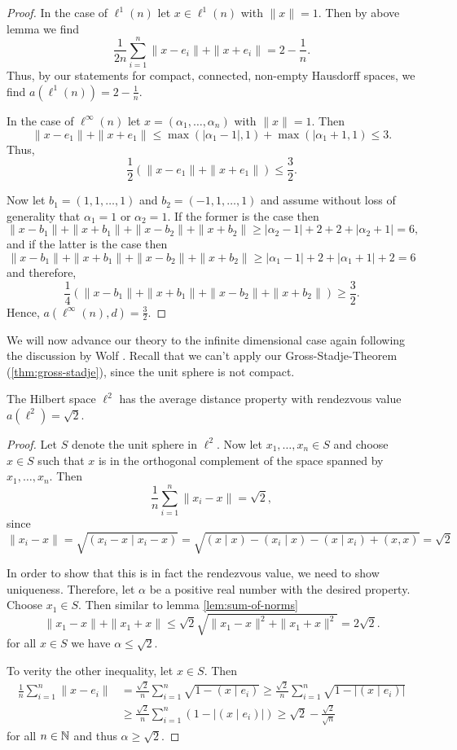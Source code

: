\begin{proof}
	In the case of $\ell^1(n)$ let $x\in \ell^1(n)$ with $\|x\|=1$. Then by above lemma we find\[
	\frac{1}{2n}\sum_{i=1}^{n}\|x-e_i\|+\|x+e_i\|=2-\frac{1}{n}.
	\]
	Thus, by our statements for compact, connected, non-empty Hausdorff spaces, we find $a(\ell^1(n))=2-\frac{1}{n}$.
	
	In the case of $\ell^\infty(n)$ let $x=(\alpha_1,\dots,\alpha_n)$ with $\|x\|=1$. Then
	\[
	\|x-e_1\|+\|x+e_1\|\leq \max(|\alpha_1-1|,1)+\max(|\alpha_1+1,1)\leq 3.
	\]
	Thus, 
	\[
	\frac{1}{2}(\|x-e_1\|+\|x+e_1\|)\leq \frac{3}{2}.
	\]
	
	Now let $b_1=(1,1,\dots,1)$ and $b_2=(-1,1,\dots,1)$ and assume without loss of generality that $\alpha_1=1$ or $\alpha_2=1$.
	If the former is the case then
	\[
	\|x-b_1\|+\|x+b_1\|+\|x-b_2\|+\|x+b_2\|\geq |\alpha_2-1|+2+2+|\alpha_2+1|=6,
	\]
	and if the latter is the case then
	\[
	\|x-b_1\|+\|x+b_1\|+\|x-b_2\|+\|x+b_2\|\geq |\alpha_1-1|+2+|\alpha_1+1|+2=6
	\]
	and therefore,
	\[
	\frac{1}{4}(\|x-b_1\|+\|x+b_1\|+\|x-b_2\|+\|x+b_2\|)\geq \frac{3}{2}.
	\]
	Hence, $a(\ell^\infty(n),d)=\frac{3}{2}$.
\end{proof}

We will now advance our theory to the infinite dimensional case again following the discussion by Wolf \cite{wolf:spheres}. Recall that we can't apply our Gross-Stadje-Theorem (\autoref{thm:gross-stadje}), since the unit sphere is not compact.
\begin{theorem}
	The Hilbert space $\ell^2$ has the average distance property with rendezvous value $a(\ell^2)=\sqrt{2}$. 
\end{theorem}

\begin{proof}
	Let $S$ denote the unit sphere in $\ell^2$. Now let $x_1,\dots,x_n\in S$ and choose $x\in S$ such that $x$ is in the orthogonal complement of the space spanned by $x_1,\dots,x_n$. Then
	\[
	\frac{1}{n}\sum_{i=1}^{n}\|x_i-x\|=\sqrt{2},
	\]
	since 
	\[
	\|x_i-x\|=\sqrt{(x_i-x\mid x_i-x)}=\sqrt{(x\mid x)-(x_i\mid x)-(x\mid x_i)+(x,x)}=\sqrt{2}
	\]
	
	In order to show that this is in fact the rendezvous value, we need to show uniqueness. Therefore, let $\alpha$ be a positive real number with the desired property. Choose $x_1\in S$. Then similar to lemma \ref{lem:sum-of-norms}
	\[
	\|x_1-x\|+\|x_1+x\|\leq \sqrt{2}\sqrt{\|x_1-x\|^2+\|x_1+x\|^2}=2\sqrt{2}.
	\]
	for all $x\in S$ we have $\alpha\leq \sqrt{2}$.
	
	To verity the other inequality, let $x\in S$. Then
	\begin{align*}
	\frac{1}{n}\sum_{i=1}^n\|x-e_i\|&=\frac{\sqrt{2}}{n}\sum_{i=1}^{n}\sqrt{1-(x\mid e_i)}\geq\frac{\sqrt{2}}{n}\sum_{i=1}^n\sqrt{1-|(x\mid e_i)|}
	\\
	&\geq\frac{\sqrt{2}}{n}\sum_{i=1}^n(1-|(x\mid e_i)|)\geq \sqrt{2}-\frac{\sqrt{2}}{\sqrt{n}}
	\end{align*}
	for all $n\in \mathbb{N}$ and thus $\alpha\geq\sqrt{2}$.
\end{proof}

